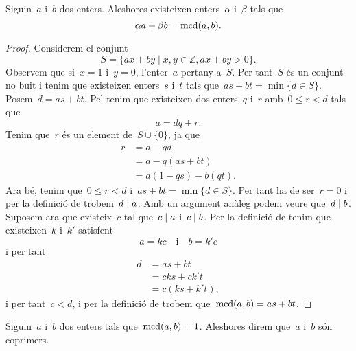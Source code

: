 \documentclass[../../main.tex]{subfiles}
\begin{document}
    \begin{theorem}
        \label{thm:identitat de Bézout}
        Siguin~\(a\) i~\(b\) dos enters.
        Aleshores existeixen enters~\(\alpha\) i~\(\beta\) tals que
        \[
            \alpha a+\beta b=\operatorname{mcd}(a,b).
        \]
        \begin{proof}
            Considerem el conjunt
            \[
                S=\{ax+by\mid x,y\in\mathbb{Z}, ax+by>0\}.
            \]
            Observem que si~\(x=1\) i~\(y=0\), l'enter~\(a\) pertany a~\(S\).
            Per tant~\(S\) és un conjunt no buit i tenim que existeixen enters~\(s\) i~\(t\) tals que~\(as+bt=\min\{d\in S\}\).
            Posem~\(d=as+bt\).
            Pel  tenim que existeixen dos enters~\(q\) i~\(r\) amb~\(0\leq r<d\) tals que
            \[
                a=dq+r.
            \]
            Tenim que~\(r\) és un element de~\(S\cup\{0\}\), ja que
            \begin{align*}
            r&=a-qd\\
            &=a-q(as+bt)\\
            &=a(1-qs)-b(qt).
            \end{align*}
            Ara bé, tenim que~\(0\leq r<d\) i~\(as+bt=\min\{d\in S\}\).
            Per tant ha de ser~\(r=0\) i per la definició de  trobem~\(d\mathrel{|} a\).
            Amb un argument anàleg podem veure que~\(d\mathrel{|} b\).
            Suposem ara que existeix~\(c\) tal que~\(c\mathrel{|} a\) i~\(c\mathrel{|} b\).
            Per la definició de  tenim que existeixen~\(k\) i~\(k'\) satisfent
            \[
                a=kc\quad\text{i}\quad b=k'c
            \]
            i per tant
            \begin{align*}
            d&=as+bt\\
            &=cks+ck't\\
            &=c(ks+k't),
            \end{align*}
            i per tant~\(c<d\), i per la definició de  trobem que~\(\operatorname{mcd}(a,b)=as+bt\).
        \end{proof}
    \end{theorem}
    \begin{definition}[Coprimers]
        \label{def:coprimers}
        Siguin~\(a\) i~\(b\) dos enters tals que~\(\operatorname{mcd}(a,b)=1\).
        Aleshores direm que~\(a\) i~\(b\) són coprimers.
    \end{definition}
\end{document}
